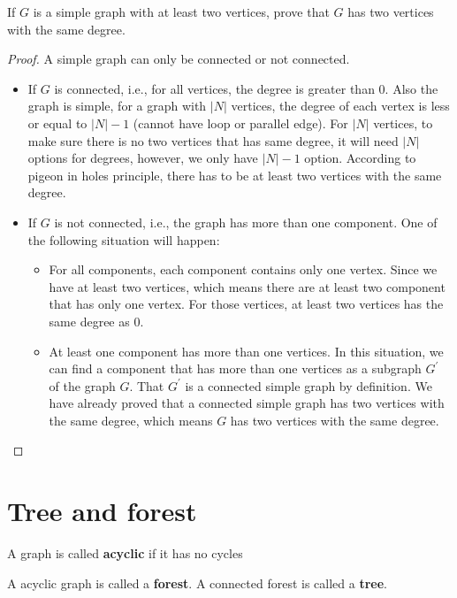 			\begin{problem}
				If $G$ is a simple graph with at least two vertices, prove that $G$ has two vertices with the same degree.
			\end{problem}

			\begin{proof}
				A simple graph can only be connected or not connected.
				\begin{itemize}
					\item If $G$ is connected, i.e., for all vertices, the degree is greater than 0. Also the graph is simple, for a graph with $|N|$ vertices, the degree of each vertex is less or equal to $|N| - 1$ (cannot have loop or parallel edge). For $|N|$ vertices, to make sure there is no two vertices that has same degree, it will need $|N|$ options for degrees, however, we only have $|N| - 1$ option. According to pigeon in holes principle, there has to be at least two vertices with the same degree.
					\item If $G$ is not connected, i.e., the graph has more than one component. One of the following situation will happen:
					\begin{itemize}
						\item For all components, each component contains only one vertex. Since we have at least two vertices, which means there are at least two component that has only one vertex. For those vertices, at least two vertices has the same degree as 0.
						\item At least one component has more than one vertices. In this situation, we can find a component that has more than one vertices as a subgraph $G^\prime$ of the graph $G$. That $G^\prime$ is a connected simple graph by definition. We have already proved that a connected simple graph has two vertices with the same degree, which means $G$ has two vertices with the same degree.
					\end{itemize}
				\end{itemize}
			\end{proof}

		\section{Tree and forest}
			\begin{definition}
				A graph is called \textbf{acyclic} if it has no cycles
			\end{definition}
			
			\begin{definition}
				A acyclic graph is called a \textbf{forest}. A connected forest is called a \textbf{tree}. 
			\end{definition}


